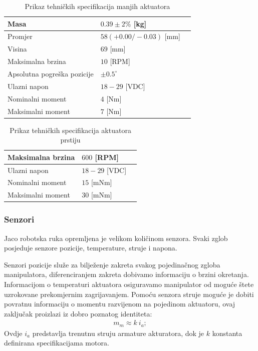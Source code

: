 \documentclass[times, utf8, diplomski, numeric]{fer}
\begin{document}
\begin{table}[h!]
    \centering
    \begin{tabular}{ | l | l | l |}
    \hline
    Masa & $0.39 \pm 2\%$ [kg] \\ \hline
    Promjer  & $58(+0.00/-0.03)$ [mm] \\ \hline
    Visina & $69$ [mm] \\ \hline
    Maksimalna brzina & $10$ [RPM] \\ \hline
    Apsolutna pogreška pozicije & $\pm0.5^{\circ}$ \\ \hline
    Ulazni napon  & $18 - 29$ [VDC] \\ \hline
    Nominalni moment & $4$ [Nm] \\ \hline
    Maksimalni moment & $7$  [Nm]  \\ \hline
    \end{tabular}
    \caption{Prikaz tehničkih specifikacija manjih aktuatora} \label{spec_act_small}
\end{table}

\begin{table}[h!]
    \centering
    \begin{tabular}{ | l | l | l |}
    \hline
    Maksimalna brzina & $600$ [RPM] \\ \hline
    Ulazni napon  & $18 - 29$ [VDC] \\ \hline
    Nominalni moment & $15$ [mNm] \\ \hline
    Maksimalni moment & $30$  [mNm]  \\ \hline
    \end{tabular}
    \caption{Prikaz tehničkih specifikacija aktuatora prstiju} \label{spec_act_finger}
\end{table}

\subsubsection{Senzori}
Jaco robotska ruka opremljena je velikom količinom senzora.
Svaki zglob posjeduje senzore pozicije, temperature, struje i napona.
                                                                                                                            
Senzori pozicije služe za bilježenje zakreta svakog pojedinačnog zgloba manipulatora, diferenciranjem zakreta dobivamo informaciju o brzini okretanja.
Informacijom o temperaturi aktuatora osiguravamo manipulator od moguće štete uzrokovane prekomjernim zagrijavanjem.
Pomoću senzora struje moguće je dobiti povratnu informaciju o momentu razvijenom na pojedinom aktuatoru, ovaj zaključak proizlazi iz dobro poznatog identiteta:
\begin{align}
m_m \approx k \ i_a;
\end{align}
Ovdje $i_a$ predstavlja trenutnu struju armature akturatora, dok je $k$ konstanta definirana specifikacijama motora.
\end{document}
